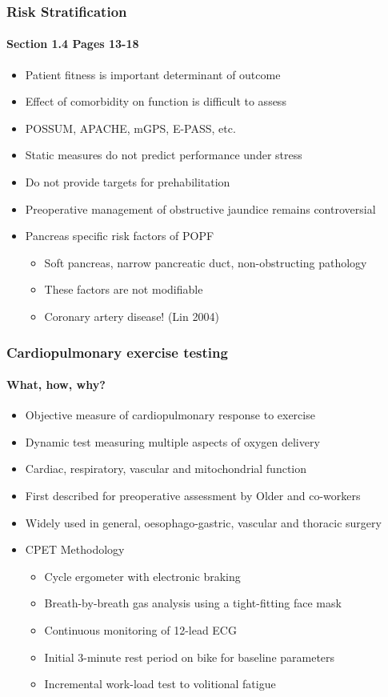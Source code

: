 \documentclass[10pt]{beamer}
\begin{document}
\begin{frame}
	\frametitle{Risk Stratification }
	\framesubtitle{Section 1.4 Pages 13-18 }
	\begin{itemize}
		\item Patient fitness is important determinant of outcome
		\item Effect of comorbidity on function is difficult to assess
		\item POSSUM, APACHE, mGPS, E-PASS, etc.
		\item Static measures do not predict performance under stress
		\item Do not provide targets for prehabilitation
		\item Preoperative management of obstructive jaundice remains controversial
		\item Pancreas specific risk factors of POPF
		\begin{itemize}
			\item Soft pancreas, narrow pancreatic duct, non-obstructing pathology
			\item These factors are not modifiable
			\item Coronary artery disease! (Lin 2004)
		\end{itemize}
	\end{itemize}
\end{frame}

\begin{frame}
	\frametitle{Cardiopulmonary exercise testing}
	\framesubtitle{What, how, why?}
	\begin{itemize}
	
		\item Objective measure of cardiopulmonary response to exercise
		\item Dynamic test measuring multiple aspects of oxygen delivery
		\item Cardiac, respiratory, vascular and mitochondrial function
		\item First described for preoperative assessment by Older and co-workers
		\item Widely used in general, oesophago-gastric, vascular and thoracic surgery
		\item CPET Methodology
		\begin{itemize}
			\item Cycle ergometer with electronic braking
			\item Breath-by-breath gas analysis using a tight-fitting face mask
			\item Continuous monitoring of 12-lead ECG
			\item Initial 3-minute rest period on bike for baseline parameters
			\item Incremental work-load test to volitional fatigue
		\end{itemize}
	\end{itemize}
\end{frame}
\end{document}
